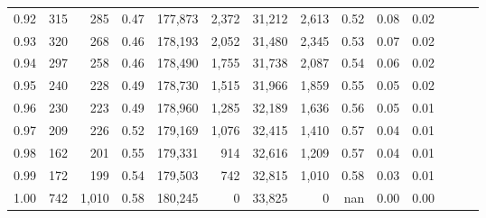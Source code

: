 \begin{tabular}{rrrrrrrrrrrrrr}
0.92 &    315 &    285 &  0.47 &  177,873 &    2,372 &  31,212 &   2,613 &  0.52 &  0.08 &      0.02 \\
0.93 &    320 &    268 &  0.46 &  178,193 &    2,052 &  31,480 &   2,345 &  0.53 &  0.07 &      0.02 \\
0.94 &    297 &    258 &  0.46 &  178,490 &    1,755 &  31,738 &   2,087 &  0.54 &  0.06 &      0.02 \\
0.95 &    240 &    228 &  0.49 &  178,730 &    1,515 &  31,966 &   1,859 &  0.55 &  0.05 &      0.02 \\
0.96 &    230 &    223 &  0.49 &  178,960 &    1,285 &  32,189 &   1,636 &  0.56 &  0.05 &      0.01 \\
0.97 &    209 &    226 &  0.52 &  179,169 &    1,076 &  32,415 &   1,410 &  0.57 &  0.04 &      0.01 \\
0.98 &    162 &    201 &  0.55 &  179,331 &      914 &  32,616 &   1,209 &  0.57 &  0.04 &      0.01 \\
0.99 &    172 &    199 &  0.54 &  179,503 &      742 &  32,815 &   1,010 &  0.58 &  0.03 &      0.01 \\
1.00 &    742 &  1,010 &  0.58 &  180,245 &        0 &  33,825 &       0 &   nan &  0.00 &      0.00 \\
\bottomrule
\end{tabular}

